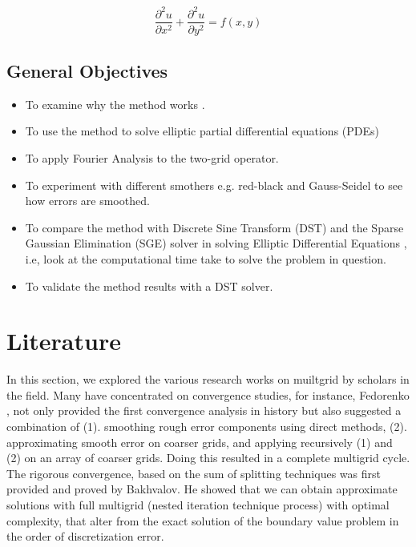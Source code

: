 \documentclass[12pt,a4paper]{article}
\begin{document}
	\begin{equation}
		\frac{\partial^{2} u}{\partial x ^{2} } + 	\frac{\partial^{2} u}{\partial y ^{2} } = f(x,y)
		\label{poi}
	\end{equation} 
	
	\subsection{General Objectives}
	
\begin{itemize}
	\item To examine why the method works	\cite{trottenberg2000multigrid}.
	\item  To use the method  to solve elliptic partial differential equations (PDEs)
	\item To apply Fourier Analysis to the two-grid operator.
	\item To experiment with different smothers e.g. red-black and Gauss-Seidel to see how errors are smoothed.
	\item To compare the method with Discrete Sine Transform  (DST)  and the Sparse Gaussian Elimination (SGE) solver in solving Elliptic Differential Equations , i.e, look at the computational time take to solve the problem in question. 
	\item To validate the method results with a DST solver.
\end{itemize}



	\section{Literature}
	In this section, we explored the various research works on muiltgrid by scholars in the field. Many have concentrated on convergence studies, for instance, Fedorenko \cite{fedorenko1964speed}, not only  provided the first convergence analysis in history but also suggested a combination of (1). smoothing rough error components using direct methods, (2). approximating smooth error on coarser grids, and applying recursively (1) and (2) on an array of coarser grids. Doing this resulted in a complete multigrid cycle. \\
	
	\noindent The  rigorous convergence,  based on the sum of splitting techniques  was first provided and proved  by Bakhvalov\cite{bakhvalov1966convergence}.  He showed that we can obtain approximate solutions with full multigrid (nested iteration technique process) with optimal complexity, that alter from the exact solution of the boundary value problem in the order of discretization error.\\
	
\end{document}
